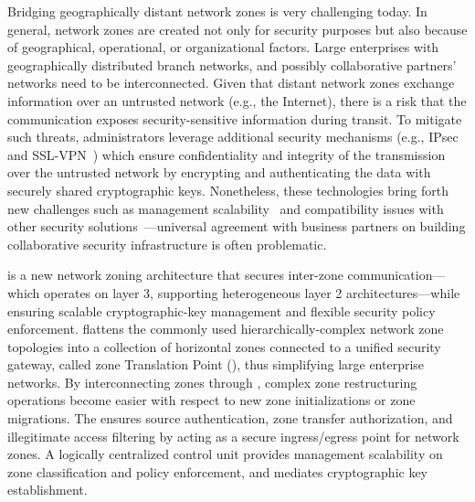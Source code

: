 Bridging geographically distant network zones is very challenging today. In
general, network zones are created not only for security purposes but also
because of geographical, operational, or organizational factors. Large
enterprises with geographically distributed branch networks, and possibly
collaborative partners' networks need to be interconnected. Given that distant
network zones exchange information over an untrusted network (e.g., the
Internet), there is a risk that the communication exposes security-sensitive
information during transit. To mitigate such threats, administrators leverage
additional security mechanisms (e.g., IPsec~\cite{rfc4301} and
SSL-VPN~\cite{sun2011advantages}) which ensure confidentiality and integrity of
the transmission over the untrusted network by encrypting and authenticating the
data with securely shared cryptographic keys. Nonetheless, these technologies
bring forth new challenges such as management
scalability~\cite{felsch2018dangers} and compatibility issues with other
security solutions~\cite{liu2008collaborative}---universal agreement with
business partners on building collaborative security infrastructure is often
problematic.


\name is a new network zoning architecture that secures inter-zone
communication---which operates on layer 3, supporting heterogeneous layer 2
architectures---while ensuring scalable cryptographic-key management and
flexible security policy enforcement. \name flattens the commonly used
hierarchically-complex network zone topologies into a collection of horizontal
zones connected to a unified security gateway, called zone Translation Point
(\tp), thus simplifying large enterprise networks. By interconnecting zones
through \tps, complex zone restructuring operations become easier with respect
to new zone initializations or zone migrations. The \tp ensures source
authentication, zone transfer authorization, and illegitimate access filtering
by acting as a secure ingress/egress point for network zones. A logically
centralized control unit provides management scalability on zone classification
and policy enforcement, and mediates cryptographic key establishment.

